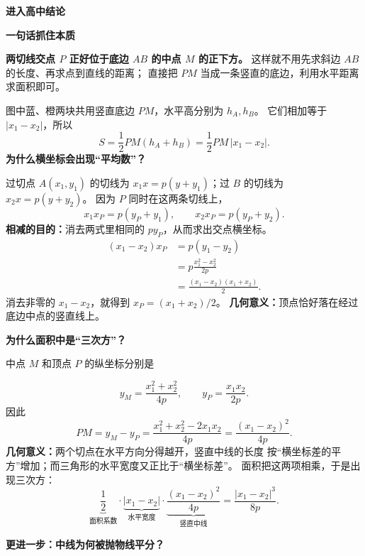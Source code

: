 \begin{explanationbox}
    \medskip
    \textbf{\textcolor{CExplanation}{进入高中结论}}


    \textbf{\textcolor{CExplanation}{一句话抓住本质}}

    \textbf{两切线交点 $P$ 正好位于底边 $AB$ 的中点 $M$ 的正下方。}
    这样就不用先求斜边 $AB$ 的长度、再求点到直线的距离；
    直接把 $PM$ 当成一条竖直的底边，利用水平距离求面积即可。

    \medskip

    
    图中蓝、橙两块共用竖直底边 $PM$，水平高分别为 $h_A,h_B$。
    它们相加等于 $|x_1-x_2|$，所以
    \[
        S=\frac12 PM(h_A+h_B)=\frac12 PM\,|x_1-x_2|.
    \]
    \medskip
    \textbf{\textcolor{CExplanation}{为什么横坐标会出现“平均数”？}}

    过切点 $A(x_1,y_1)$ 的切线为
    $x_1x=p(y+y_1)$；过 $B$ 的切线为 $x_2x=p(y+y_2)$。
    因为 $P$ 同时在这两条切线上，
    \[
        x_1x_P=p(y_P+y_1),\qquad
        x_2x_P=p(y_P+y_2).
    \]
    \textbf{相减的目的：}消去两式里相同的 $py_P$，从而求出交点横坐标。
    \[
    \begin{aligned}
        (x_1-x_2)x_P
        &=p(y_1-y_2)\\
        &=p\frac{x_1^2-x_2^2}{2p}\\
        &=\frac{(x_1-x_2)(x_1+x_2)}{2}.
    \end{aligned}
    \]
    消去非零的 $x_1-x_2$，就得到 $x_P=(x_1+x_2)/2$。
    \textbf{几何意义：}顶点恰好落在经过底边中点的竖直线上。

    \medskip
    \par\noindent\begin{minipage}{\linewidth}
    \textbf{\textcolor{CExplanation}{为什么面积中是“三次方”？}}

    中点 $M$ 和顶点 $P$ 的纵坐标分别是
    \end{minipage}\par
    \[
        y_M=\frac{x_1^2+x_2^2}{4p},\qquad
        y_P=\frac{x_1x_2}{2p}.
    \]
    因此
    \[
        PM=y_M-y_P
        =\frac{x_1^2+x_2^2-2x_1x_2}{4p}
        =\frac{(x_1-x_2)^2}{4p}.
    \]
    \textbf{几何意义：}两个切点在水平方向分得越开，竖直中线的长度
    按“横坐标差的平方”增加；而三角形的水平宽度又正比于“横坐标差”。
    面积把这两项相乘，于是出现三次方：
    \[
        \underbrace{\frac12}_{\text{面积系数}}
        \cdot\underbrace{|x_1-x_2|}_{\text{水平宽度}}
        \cdot\underbrace{\frac{(x_1-x_2)^2}{4p}}_{\text{竖直中线}}
        =\frac{|x_1-x_2|^3}{8p}.
    \]

    \medskip
    \textbf{\textcolor{CExplanation}{更进一步：中线为何被抛物线平分？}}



\end{explanationbox}
